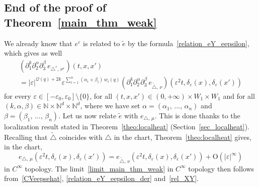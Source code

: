 \documentclass[10pt]{amsart}
\theoremstyle{definition}\newtheorem{defi}[theo]{Definition}\newtheorem{rema}[theo]{Remark}\newtheorem{exam}[theo]{Example}\newtheorem{exem}[theo]{Example}\newtheorem{nota}[theo]{Notation}
\newcommand*\N{\mathbb{N}}
\newcommand{\calQ}{\mathcal{Q}}
\newcommand{\rmO}{\mathrm{O}}
\begin{document}
\subsection{End of the proof of Theorem~\ref{main_thm_weak}}\label{sec_proof_weak_main_thm}
We already know that $e^\varepsilon$ is related to $\widetilde e$ by the formula~\eqref{relation_eY_eepsilon}, which gives as well
\begin{multline}\label{relation_eY_eepsilon_der}
\left(\partial_1^k \partial_2^\alpha \partial_3^\beta \, e_{\triangle^\varepsilon,\,\nu^\varepsilon}\right) (t,x,x') \\
= \vert\varepsilon\vert^{\calQ(q)+2k} \varepsilon^{\sum_{i=1}^n \left(\alpha_i+\beta_i\right)\,w_i(q)} \left(\partial_1^k \partial_2^\alpha \partial_3^\beta \, e_{\widetilde\triangle,\,\nu}\right) \left(\varepsilon^2 t,\delta_\varepsilon(x),\delta_\varepsilon(x')\right)
\end{multline}
for every $\varepsilon\in[-\varepsilon_0,\varepsilon_0]\setminus\{0\}$, for all $(t,x,x')\in(0,+\infty)\times W_1\times W_1$ and for all $(k,\alpha,\beta)\in\N\times\N^d\times\N^d$, where we have set $\alpha=(\alpha_1,\,\ldots,\,\alpha_n)$ and $\beta=(\beta_1,\,\ldots,\,\beta_n)$. Let us now relate $\widetilde e$ with $e_{\triangle,\,\mu}$. This is done thanks to the localization result stated in Theorem~\ref{theo:localheat} (Section~\ref{sec_localheat}). Recalling that $\widetilde\triangle$ coincides with $\triangle$ in the chart, Theorem~\ref{theo:localheat} gives, in the chart,
\begin{equation}\label{rel_XY}
e_{\triangle,\,\mu} \left(\varepsilon^2 t,\delta_\varepsilon(x),\delta_\varepsilon(x')\right) = e_{\widetilde\triangle,\,\nu} \left(\varepsilon^2 t,\delta_\varepsilon(x),\delta_\varepsilon(x')\right) + \rmO(\vert\varepsilon\vert^\infty)
\end{equation}
in $C^\infty$ topology. The limit~\eqref{limit_main_thm_weak} in $C^\infty$ topology then follows from~\eqref{CVeepsehat}, \eqref{relation_eY_eepsilon_der} and~\eqref{rel_XY}.


\goodbreak
\end{document}
